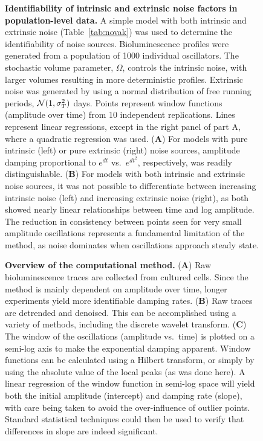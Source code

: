 \documentclass[11pt, letterpaper]{article}
\begin{document}
\begin{figure}[tbp]
  \begin{center}
  \end{center}
  \caption{{\bfseries Identifiability of intrinsic and extrinsic noise factors in population-level data.} A simple model with both intrinsic and extrinsic noise (Table~\ref{tab:novak}) was used to determine the identifiability of noise sources. Bioluminescence profiles were generated from a population of 1000 individual oscillators. The stochastic volume parameter, $\Omega$, controls the intrinsic noise, with larger volumes resulting in more deterministic profiles. Extrinsic noise was generated by using a normal distribution of free running periods, ${\cal N}(1, \sigma^2_T)$ days. Points represent window functions (amplitude over time) from 10 independent replications. Lines represent linear regressions, except in the right panel of part A, where a quadratic regression was used.
  ({\bfseries A}) For models with pure intrinsic (left) or pure extrinsic (right) noise sources, amplitude damping proportional to $e^{dt}$ vs.\ $e^{dt^2}$, respectively, was readily distinguishable. 
  ({\bfseries B}) For models with both intrinsic and extrinsic noise sources, it was not possible to differentiate between increasing intrinsic noise (left) and increasing extrinsic noise (right), as both showed nearly linear relationships between time and log amplitude.
  The reduction in consistency between points seen for very small amplitude oscillations represents a fundamental limitation of the method, as noise dominates when oscillations approach steady state.
}
  \label{fig:computational_dephasing}
\end{figure}

\begin{figure}[tbp]
  \begin{center}
  \end{center}
  \caption{{\bfseries Overview of the computational method.} ({\bfseries A}) Raw bioluminescence traces are collected from cultured cells. Since the method is mainly dependent on amplitude over time, longer experiments yield more identifiable damping rates. ({\bfseries B}) Raw traces are detrended and denoised. This can be accomplished using a variety of methods, including the discrete wavelet transform. ({\bfseries C}) The window of the oscillations (amplitude vs.\ time) is plotted on a semi-log axis to make the exponential damping apparent. Window functions can be calculated using a Hilbert transform, or simply by using the absolute value of the local peaks (as was done here). A linear regression of the window function in semi-log space will yield both the initial amplitude (intercept) and damping rate (slope), with care being taken to avoid the over-influence of outlier points. Standard statistical techniques could then be used to verify that differences in slope are indeed significant.}
  \label{fig:comp_overview}
\end{figure}
\end{document}
